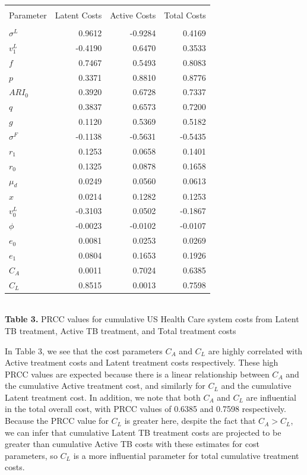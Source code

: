 \documentclass{amsart}
\begin{document}
\begin{table}[h]
\centering
\begin{tabular}{l r r r}
\hline\hline\\
Parameter & Latent Costs & Active Costs & Total Costs\\ [0.5ex]
\hline\\
$\sigma^{L}$ & 0.9612  & -0.9284 & 0.4169 \\
$v^{L}_{1}$  & -0.4190 & 0.6470  & 0.3533 \\
$f$          & 0.7467  & 0.5493  & 0.8083 \\
$p$          & 0.3371  & 0.8810  & 0.8776 \\
$ARI_{0}$    & 0.3920  & 0.6728  & 0.7337 \\
$q$          & 0.3837  & 0.6573  & 0.7200 \\
$g$          & 0.1120  & 0.5369  & 0.5182 \\
$\sigma^{F}$ & -0.1138 & -0.5631 &-0.5435 \\
$r_{1}$      & 0.1253  &  0.0658 & 0.1401 \\
$r_{0}$      & 0.1325  & 0.0878  & 0.1658 \\
$\mu_{d}$    & 0.0249  & 0.0560  & 0.0613 \\
$x$          & 0.0214  & 0.1282  & 0.1253 \\
$v^{L}_{0}$  & -0.3103 & 0.0502  &-0.1867 \\
$\phi$       & -0.0023 & -0.0102 &-0.0107 \\
$e_{0}$      & 0.0081  & 0.0253  & 0.0269 \\
$e_{1}$      & 0.0804  & 0.1653  & 0.1926 \\
$C_{A}$      & 0.0011  & 0.7024  & 0.6385 \\
$C_{L}$      & 0.8515  & 0.0013  & 0.7598 \\ [1ex]
\hline
\end{tabular}\\[1ex]

{\bf Table 3.} PRCC values for cumulative US Health Care system costs from 
Latent TB treatment, Active TB treatment, and Total treatment costs
\end{table}

In Table 3, we see that the cost parameters $C_{A}$ and $C_{L}$ are highly
correlated with Active treatment costs and Latent treatment costs respectively.
These high PRCC values are expected because there is a linear relationship
between $C_{A}$ and the cumulative Active treatment cost, and similarly for
$C_{L}$ and the cumulative Latent treatment cost.  In addition, we note that
both $C_{A}$ and $C_{L}$ are influential in the total overall cost, with PRCC
values of 0.6385 and 0.7598 respectively.  Because the PRCC value for $C_{L}$ is
greater here, despite the fact that $C_{A} > C_{L}$, we can infer that
cumulative Latent TB treatment costs are projected to be greater than cumulative
Active TB costs with these estimates for cost parameters, so $C_{L}$ is a more
influential parameter for total cumulative treatment costs.  
\end{document}
